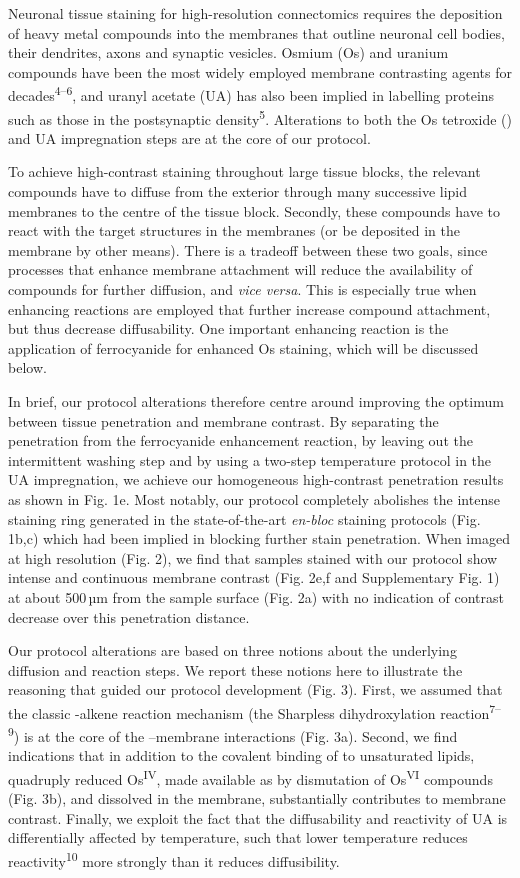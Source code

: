 \documentclass{article}
\begin{document}
Neuronal tissue staining for high-resolution connectomics requires the deposition of heavy metal compounds into the membranes that outline neuronal cell bodies, their dendrites, axons and synaptic vesicles. Osmium (Os) and uranium compounds have been the most widely employed membrane contrasting agents for decades\textsuperscript{4–6}, and uranyl acetate (UA) has also been implied in labelling proteins such as those in the postsynaptic density\textsuperscript{5}. Alterations to both the Os tetroxide () and UA impregnation steps are at the core of our protocol.

To achieve high-contrast staining throughout large tissue blocks, the relevant compounds have to diffuse from the exterior through many successive lipid membranes to the centre of the tissue block. Secondly, these compounds have to react with the target structures in the membranes (or be deposited in the membrane by other means). There is a tradeoff between these two goals, since processes that enhance membrane attachment will reduce the availability of compounds for further diffusion, and \emph{vice versa}. This is especially true when enhancing reactions are employed that further increase compound attachment, but thus decrease diffusability. One important enhancing reaction is the application of ferrocyanide for enhanced Os staining, which will be discussed below.

In brief, our protocol alterations therefore centre around improving the optimum between tissue penetration and membrane contrast. By separating the  penetration from the ferrocyanide enhancement reaction, by leaving out the intermittent washing step and by using a two-step temperature protocol in the UA impregnation, we achieve our homogeneous high-contrast penetration results as shown in Fig. 1e. Most notably, our protocol completely abolishes the intense staining ring generated in the state-of-the-art \emph{en-bloc} staining protocols (Fig. 1b,c) which had been implied in blocking further stain penetration. When imaged at high resolution (Fig. 2), we find that samples stained with our protocol show intense and continuous membrane contrast (Fig. 2e,f and Supplementary Fig. 1) at about 500\,µm from the sample surface (Fig. 2a) with no indication of contrast decrease over this penetration distance.

Our protocol alterations are based on three notions about the underlying diffusion and reaction steps. We report these notions here to illustrate the reasoning that guided our protocol development (Fig. 3). First, we assumed that the classic -alkene reaction mechanism (the Sharpless dihydroxylation reaction\textsuperscript{7–9}) is at the core of the –membrane interactions (Fig. 3a). Second, we find indications that in addition to the covalent binding of  to unsaturated lipids, quadruply reduced Os\textsuperscript{IV}, made available as  by dismutation of Os\textsuperscript{VI} compounds (Fig. 3b), and dissolved in the membrane, substantially contributes to membrane contrast. Finally, we exploit the fact that the diffusability and reactivity of UA is differentially affected by temperature, such that lower temperature reduces reactivity\textsuperscript{10} more strongly than it reduces diffusibility.
\end{document}
